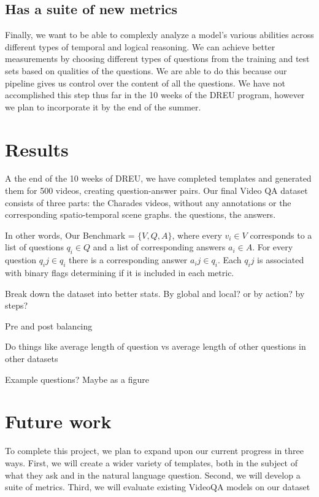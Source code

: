 \documentclass[10pt,twocolumn,letterpaper]{article}
\newcommand{\mgm}[1]{{\color{cyan}{mgm: #1}}}
\begin{document}
    \subsection{Has a suite of new metrics}
    
    Finally, we want to be able to complexly analyze a model's various abilities across different types of temporal and logical reasoning. We can achieve better measurements by choosing different types of questions from the training and test sets based on qualities of the questions. We are able to do this because our pipeline gives us control over the content of all the questions. We have not accomplished this step thus far in the 10 weeks of the DREU program, however we plan to incorporate it by the end of the summer. 

\section{Results}

A the end of the 10 weeks of DREU, we have completed \mgm{this many} templates and generated them for 500 videos, creating \mgm{this many} question-answer pairs. Our final Video QA dataset consists of three parts: the Charades videos, without any annotations or the corresponding spatio-temporal scene graphs. the questions, the answers. 

In other words, Our Benchmark = $\{ V, Q, A \}$, where every $v_i \in V$ corresponds to a list of questions $q_i  \in Q$ and a list of corresponding answers $a_i \in A$. For every question $q_ij \in q_i$ there is a corresponding answer $a_ij \in q_i$. Each $q_ij$ is associated with binary flags determining if it is included in each metric.



Break down the dataset into better stats.  By global and local? or by action? by steps?

Pre and post balancing



Do things like average length of question vs average length of other questions in other datasets

Example questions? Maybe as a figure




\section{Future work}

To complete this project, we plan to expand upon our current progress in three ways. First, we will create a wider variety of templates, both in the subject of what they ask and in the natural language question. Second, we will develop a suite of metrics. Third, we will evaluate existing VideoQA models on our dataset \cite{le2020hierarchical, fan2019heterogeneous, li2019beyond}
\end{document}
